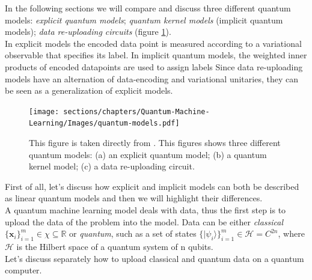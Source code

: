 In the following sections we will compare and discuss three different quantum models: \textit{explicit quantum models}; 
\textit{quantum kernel models} (implicit quantum models); \textit{data re-uploading circuits} 
(figure \ref{fig:quantum-models}).\\
In explicit models the encoded data point is measured according to a variational observable that specifies its label.
In implicit quantum models, the weighted inner products of encoded datapoints are used to assign labels
Since data re-uploading models have an alternation of data-encoding and variational unitaries, they 
can be seen as a generalization of explicit models.


\begin{figure}[h]
    \centering
    \texttt{[image: sections/chapters/Quantum-Machine-Learning/Images/quantum-models.pdf]}
    \caption{This figure is taken directly from \cite{Jerbi_2023}. This figures shows three different quantum models:
    (a) an explicit quantum model; (b) a quantum kernel model; (c) a data re-uploading circuit.}
    \label{fig:quantum-models}
\end{figure}

First of all, let's discuss how explicit and implicit models can both be described as linear quantum models and then
we will highlight their differences.\\
A quantum machine learning model deals with data, thus the first step is to upload the data of the 
problem into the model.
Data can be either \textit{classical} $\{\bm{x}_i\}_{i=1}^m \in \chi \subseteq \mathbb{R}$ 
or \textit{quantum}, such as a set of states $\{ |\psi_i\rangle \}_{i=1}^m \in \mathcal{H} = C^{2n}$, 
where $\mathcal{H}$ is the Hilbert space of a quantum system of n qubits.\\
Let's discuss separately how to upload classical and quantum data on a quantum computer.

